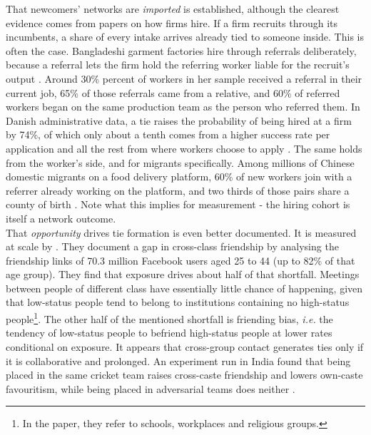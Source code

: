 \noindent That newcomers' networks are \textit{imported} is established, although the clearest evidence comes from papers on how firms hire.  If a firm recruits through its incumbents, a share of every intake arrives already tied to someone inside. This is often the case. Bangladeshi garment factories hire through referrals deliberately, because a referral lets the firm hold the referring worker liable for the recruit's output \citep{heath2018why}. Around 30\% percent of workers in her sample received a referral in their current job, 65\% of those referrals came from a relative, and 60\% of referred workers began on the same production team as the person who referred them. In Danish administrative data, a tie raises the probability of being hired at a firm by 74\%, of which only about a tenth comes from a higher success rate per application and all the rest from where workers choose to apply \citep{harmon2025coworker}. The same holds from the worker's side, and for migrants specifically. Among millions of Chinese domestic migrants on a food delivery platform, 60\%  of new workers join with a referrer already working on the platform, and two thirds of those pairs share a county of birth \citep{tang2025follow}. Note what this implies for measurement - the hiring cohort is itself a network outcome. \\


\noindent That \textit{opportunity} drives tie formation is even better documented. It is measured at scale by \citet{chetty2022social}. They document a gap in cross-class friendship by analysing the friendship links of 70.3 million Facebook users aged 25 to 44 (up to 82\% of that age group). They find that exposure drives about half of that shortfall. Meetings between people of different class have essentially little chance of happening, given that low-status people tend to belong to institutions containing no high-status people\footnote{In the paper, they refer to schools, workplaces and religious groups.}. The other half of the mentioned shortfall is friending bias, \textit{i.e.} the tendency of low-status people to befriend high-status people at lower rates conditional on exposure. It appears that cross-group contact generates ties only if it is collaborative and prolonged. An experiment run in India found that being placed in the same cricket team raises cross-caste friendship and lowers own-caste favouritism, while being placed in adversarial teams does neither \citep{lowe2021types}. \\

